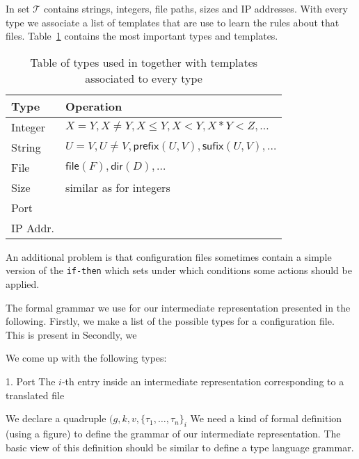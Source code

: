 In \app set $\mathcal{T}$ contains strings, integers, file paths, 
sizes and IP addresses. With every type we associate a list of templates 
that are use to learn the rules about that files. Table~\ref{table:kysymys} contains
the most important types and templates.

\begin{table}
  \begin{tabular}{| l |  l |}
    \hline
    Type & Operation  \\ \hline
    Integer & $X = Y, X\neq Y, X \leq Y, X < Y, X * Y < Z, \ldots $\\ \hline
    String & $U = V, U \neq V, \textsf{prefix}(U,V), \textsf{sufix}(U,V), \ldots$   \\ \hline
    File & $\textsf{file}(F), \textsf{dir}(D),\ldots$   \\ \hline
    Size & similar as for integers   \\ \hline
    Port &    \\ \hline
    IP Addr.  &   \\
    
    \hline
  \end{tabular}
\caption{Table of types used in \app together with templates associated to every type}
\label{table:kysymys}
\end{table}








An additional problem is that configuration files sometimes contain a simple version of the {\tt {if-then}} which 
sets under which conditions some actions should be applied. 




The formal grammar we use for our intermediate representation presented in the following. 
Firstly, we make a list of the possible types for a configuration file. This is present in 
Secondly, we 


We come up with the following types:

1. Port 
The $i$-th entry inside an intermediate representation corresponding to a 
translated file 

We declare a quadruple $(g,k,v,\{\tau_1, \ldots, \tau_n\}_i$
We need a kind of formal definition (using a figure) to
define the grammar of our intermediate representation. The basic
view of this definition should be similar to define a type language
grammar.


